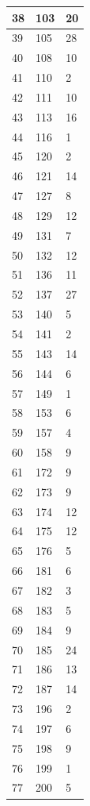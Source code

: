 \begin{tabular}{p{}p{}p{}}
\hline
38 & 103 & 20 \\
\hline
39 & 105 & 28 \\
\hline
40 & 108 & 10 \\
\hline
41 & 110 & 2 \\
\hline
42 & 111 & 10 \\
\hline
43 & 113 & 16 \\
\hline
44 & 116 & 1 \\
\hline
45 & 120 & 2 \\
\hline
46 & 121 & 14 \\
\hline
47 & 127 & 8 \\
\hline
48 & 129 & 12 \\
\hline
49 & 131 & 7 \\
\hline
50 & 132 & 12 \\
\hline
51 & 136 & 11 \\
\hline
52 & 137 & 27 \\
\hline
53 & 140 & 5 \\
\hline
54 & 141 & 2 \\
\hline
55 & 143 & 14 \\
\hline
56 & 144 & 6 \\
\hline
57 & 149 & 1 \\
\hline
58 & 153 & 6 \\
\hline
59 & 157 & 4 \\
\hline
60 & 158 & 9 \\
\hline
61 & 172 & 9 \\
\hline
62 & 173 & 9 \\
\hline
63 & 174 & 12 \\
\hline
64 & 175 & 12 \\
\hline
65 & 176 & 5 \\
\hline
66 & 181 & 6 \\
\hline
67 & 182 & 3 \\
\hline
68 & 183 & 5 \\
\hline
69 & 184 & 9 \\
\hline
70 & 185 & 24 \\
\hline
71 & 186 & 13 \\
\hline
72 & 187 & 14 \\
\hline
73 & 196 & 2 \\
\hline
74 & 197 & 6 \\
\hline
75 & 198 & 9 \\
\hline
76 & 199 & 1 \\
\hline
77 & 200 & 5 \\
\hline
\bottomrule
\end{tabular}


